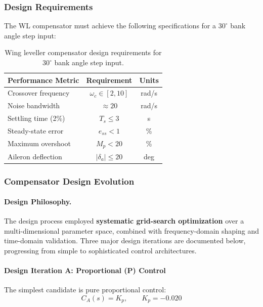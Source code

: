 \subsubsection{Design Requirements}

The WL compensator must achieve the following specifications for a $30^\circ$ bank angle step input:

\begin{table}[h!]
\centering
\begin{tabular}{lcc}
\toprule
\textbf{Performance Metric} & \textbf{Requirement} & \textbf{Units} \\
\midrule
Crossover frequency & $\omega_c \in [2, 10]$ & rad/s \\
Noise bandwidth & $\approx 20$ & rad/s \\
Settling time (2\%) & $T_s \le 3$ & s \\
Steady-state error & $e_{ss} < 1$ & \% \\
Maximum overshoot & $M_p < 20$ & \% \\
Aileron deflection & $|\delta_a| \le 20$ & deg \\
\bottomrule
\end{tabular}
\caption{Wing leveller compensator design requirements for $30^\circ$ bank angle step input.}
\label{tab:wl_requirements}
\end{table}

\subsubsection{Compensator Design Evolution}

\paragraph{Design Philosophy.}
The design process employed \textbf{systematic grid-search optimization} over a multi-dimensional parameter space, combined with frequency-domain shaping and time-domain validation. Three major design iterations are documented below, progressing from simple to sophisticated control architectures.

\paragraph{Design Iteration A: Proportional (P) Control}

The simplest candidate is pure proportional control:
\begin{equation}
C_A(s) = K_p, \qquad K_p = -0.020
\label{eq:design_A}
\end{equation}

